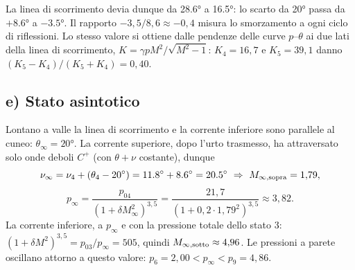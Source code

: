 \documentclass[11pt,a4paper]{article}
\newcommand{\Cp}{C^{+}}
\begin{document}
La linea di scorrimento devia dunque da \ang{28.6} a \ang{16.5}: lo scarto da \ang{20} passa da $+\ang{8.6}$ a
$-\ang{3.5}$. Il rapporto $-3{,}5/8{,}6\approx-0{,}4$ misura lo smorzamento a ogni ciclo di riflessioni. Lo stesso valore si
ottiene dalle pendenze delle curve $p$--$\theta$ ai due lati della linea di scorrimento,
$K=\gamma pM^2/\sqrt{M^2-1}$: $K_4=16{,}7$ e $K_5=39{,}1$ danno $(K_5-K_4)/(K_5+K_4)=0{,}40$.

\subsection*{e) Stato asintotico}
Lontano a valle la linea di scorrimento e la corrente inferiore sono parallele al cuneo: $\theta_\infty=\ang{20}$.
La corrente superiore, dopo l'urto trasmesso, ha attraversato solo onde deboli $\Cp$ (con $\theta+\nu$ costante),
dunque
\[
\nu_\infty=\nu_4+(\theta_4-\ang{20})=\ang{11.8}+\ang{8.6}=\ang{20.5}\ \Rightarrow\ M_{\infty,\rm sopra}=1{,}79,
\]
\[
p_\infty=\frac{p_{04}}{(1+\delta M_\infty^2)^{3{,}5}}=\frac{21{,}7}{(1+0{,}2\cdot1{,}79^2)^{3{,}5}}\approx3{,}82 .
\]
La corrente inferiore, a $p_\infty$ e con la pressione totale dello stato 3:
$(1+\delta M^2)^{3{,}5}=p_{03}/p_\infty=505$, quindi $M_{\infty,\rm sotto}\approx4{,}96$. Le pressioni a parete
oscillano attorno a questo valore: $p_6=2{,}00<p_\infty<p_9=4{,}86$.

\end{document}
